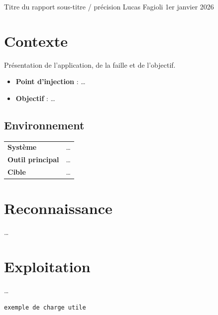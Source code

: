 \documentclass[11pt,a4paper]{article}
\begin{document}
\makecover
  {Titre du rapport}          %
  {sous-titre / précision}    %
  {                            %
  }
  {Lucas Fagioli}             %
  {1er janvier 2026}          %

\section{Contexte}
Présentation de l'application, de la faille et de l'objectif.

\begin{itemize}
  \item \textbf{Point d'injection} : \dots
  \item \textbf{Objectif} : \dots
\end{itemize}

\subsection{Environnement}
\renewcommand{\arraystretch}{1.3}
\begin{tabular}{@{}p{}p{}@{}}
  \textbf{Système}        & \dots \\
  \textbf{Outil principal}& \dots \\
  \textbf{Cible}          & \dots \\
\end{tabular}


\section{Reconnaissance}
\dots

\section{Exploitation}
\dots

\begin{lstlisting}
exemple de charge utile
\end{lstlisting}
\end{document}
